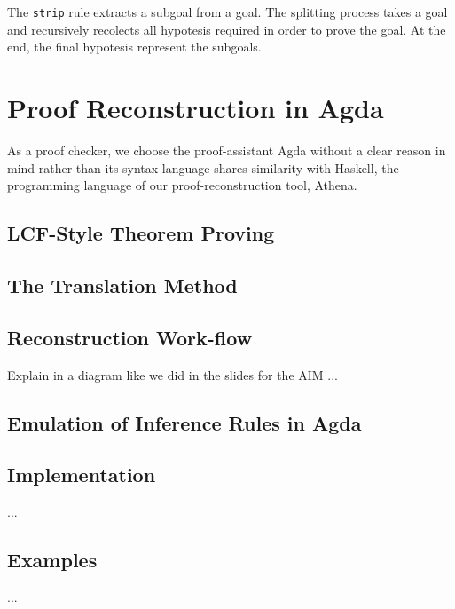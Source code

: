 \documentclass[runningheads,a4paper]{llncs}
\begin{document}
The \verb!strip! rule extracts a subgoal from a goal. The splitting process
takes a goal and recursively recolects all hypotesis required in order to prove the goal.
At the end, the final hypotesis represent the subgoals.




\section{Proof Reconstruction in Agda}
\label{secproofrecon}
As a proof checker, we choose the proof-assistant Agda without a clear reason in mind
rather than its syntax language shares similarity with Haskell, the programming language
of our proof-reconstruction tool, Athena.



\subsection{LCF-Style Theorem Proving}

\subsection{The Translation Method}
\subsection{Reconstruction Work-flow}
Explain in a diagram like we did in the slides for the AIM ...

\subsection{Emulation of Inference Rules in Agda}


%



\subsection{Implementation}
...
\subsection{Examples}
...
\end{document}
